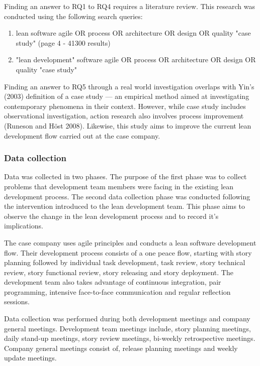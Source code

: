 \documentclass[english,12pt,a4paper,pdftex,sci,utf8]{aaltothesis}
\begin{document}
Finding an answer to RQ1 to RQ4 requires a literature review. This research was conducted using the following search queries:
\begin{enumerate}[label=\textbf{Q1\arabic*}]
\item lean software agile OR process OR architecture OR design OR quality "case study" (page 4 - 41300 results)
\item "lean development" software agile OR process OR architecture OR design OR quality "case study"
\end{enumerate}

Finding an answer to RQ5 through a real world investigation overlaps with Yin's (2003) definition of a case study --- an empirical method aimed at investigating contemporary phenomena in their context. However, while case study includes observational investigation, action research also involves process improvement (Runeson and Höst 2008). Likewise, this study aims to improve the current lean development flow carried out at the case company. 

\subsubsection{Data collection} \label{data collection}
Data was collected in two phases. The purpose of the first phase was to collect problems that development team members were facing in the existing lean development process. The second data collection phase was conducted following the intervention introduced to the lean development team. This phase aims to observe the change in the lean development process and to record it's implications.

The case company uses agile principles and conducts a lean software development flow. Their development process consists of a one peace flow, starting with story planning followed by individual task development, task review, story technical review, story functional review, story releasing and story deployment. The development team also takes advantage of continuous integration, pair programming, intensive face-to-face communication and regular reflection sessions.

Data collection was performed during both development meetings and company general meetings. Development team meetings include, story planning meetings, daily stand-up meetings, story review meetings, bi-weekly retrospective meetings. Company general meetings consist of, release planning meetings and weekly update meetings. 
\end{document}
